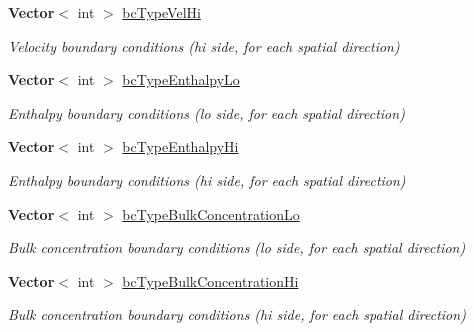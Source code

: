 \begin{DoxyCompactItemize}
\mbox{\label{class_mushy_layer_params_adb891e3de531ee991361b91b7d8aa528}} 
\textbf{ Vector}$<$ int $>$ \hyperlink{class_mushy_layer_params_adb891e3de531ee991361b91b7d8aa528}{bc\+Type\+Vel\+Hi}
\begin{DoxyCompactList}\small\item\em Velocity boundary conditions (hi side, for each spatial direction) \end{DoxyCompactList}\item 
\mbox{\label{class_mushy_layer_params_ac308a0d191cc626bf2df54e3a3a9fdca}} 
\textbf{ Vector}$<$ int $>$ \hyperlink{class_mushy_layer_params_ac308a0d191cc626bf2df54e3a3a9fdca}{bc\+Type\+Enthalpy\+Lo}
\begin{DoxyCompactList}\small\item\em Enthalpy boundary conditions (lo side, for each spatial direction) \end{DoxyCompactList}\item 
\mbox{\label{class_mushy_layer_params_ae81f844a9bb7d53ca363b255942d1f87}} 
\textbf{ Vector}$<$ int $>$ \hyperlink{class_mushy_layer_params_ae81f844a9bb7d53ca363b255942d1f87}{bc\+Type\+Enthalpy\+Hi}
\begin{DoxyCompactList}\small\item\em Enthalpy boundary conditions (hi side, for each spatial direction) \end{DoxyCompactList}\item 
\mbox{\label{class_mushy_layer_params_a255ae9ca43a9de9d1cd160504d7d8050}} 
\textbf{ Vector}$<$ int $>$ \hyperlink{class_mushy_layer_params_a255ae9ca43a9de9d1cd160504d7d8050}{bc\+Type\+Bulk\+Concentration\+Lo}
\begin{DoxyCompactList}\small\item\em Bulk concentration boundary conditions (lo side, for each spatial direction) \end{DoxyCompactList}\item 
\mbox{\label{class_mushy_layer_params_a368d1490a15b2c3ee6e62cb0aff82b5e}} 
\textbf{ Vector}$<$ int $>$ \hyperlink{class_mushy_layer_params_a368d1490a15b2c3ee6e62cb0aff82b5e}{bc\+Type\+Bulk\+Concentration\+Hi}
\begin{DoxyCompactList}\small\item\em Bulk concentration boundary conditions (hi side, for each spatial direction) \end{DoxyCompactList}\item 

\end{DoxyCompactItemize}
